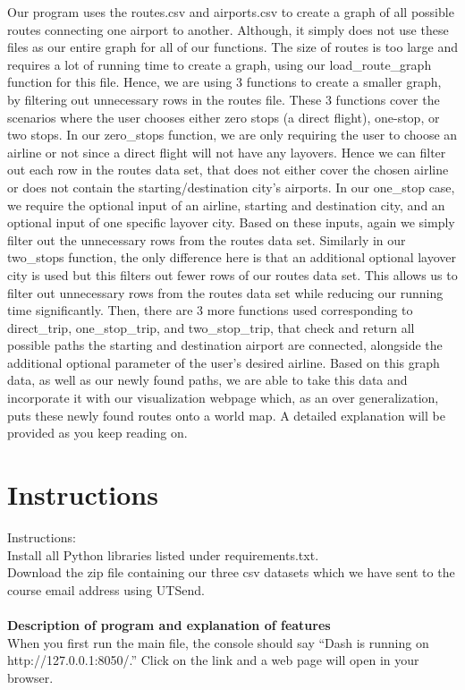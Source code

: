 \documentclass[fontsize=11pt]{article}
\begin{document}
Our program uses the routes.csv and airports.csv to create a graph of all possible routes connecting one airport to another. Although, it simply does not use these files as our entire graph for all of our functions. The size of routes is too large and requires a lot of running time to create a graph, using our load\_route\_graph function for this file. Hence, we are using 3 functions to create a smaller graph, by filtering out unnecessary rows in the routes file. These 3 functions cover the scenarios where the user chooses either zero stops (a direct flight), one-stop, or two stops. In our zero\_stops function, we are only requiring the user to choose an airline or not since a direct flight will not have any layovers. Hence we can filter out each row in the routes data set, that does not either cover the chosen airline or does not contain the starting/destination city’s airports. In our one\_stop case, we require the optional input of an airline, starting and destination city, and an optional input of one specific layover city. Based on these inputs, again we simply filter out the unnecessary rows from the routes data set. Similarly in our two\_stops function, the only difference here is that an additional optional layover city is used but this filters out fewer rows of our routes data set. This allows us to filter out unnecessary rows from the routes data set while reducing our running time significantly. Then, there are 3 more functions used corresponding to direct\_trip, one\_stop\_trip, and two\_stop\_trip, that check and return all possible paths the starting and destination airport are connected, alongside the additional optional parameter of the user’s desired airline. Based on this graph data, as well as our newly found paths, we are able to take this data and incorporate it with our visualization webpage which, as an over generalization, puts these newly found routes onto a world map. A detailed explanation will be provided as you keep reading on. \\

\newpage
\section*{Instructions}

Instructions: \\
Install all Python libraries listed under requirements.txt. \\
Download the zip file containing our three csv datasets which we have sent to the course email address using UTSend. \\ \\
\textbf{Description of program and explanation of features} \\
When you first run the main file, the console should say “Dash is running on http://127.0.0.1:8050/.” Click on the link and a web page  will open in your browser. \\ 
\end{document}
